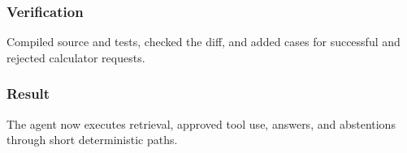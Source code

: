 \subsubsection{Verification}

Compiled source and tests, checked the diff, and added cases for successful and rejected calculator requests.

\subsubsection{Result}

The agent now executes retrieval, approved tool use, answers, and abstentions through short deterministic paths.

